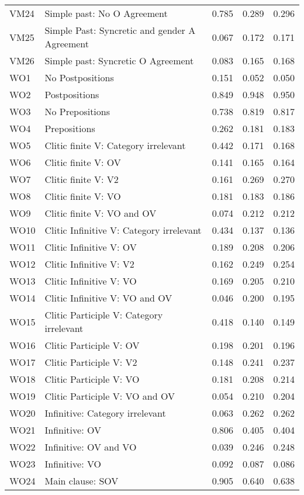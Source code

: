 \begin{longtable}{lllll}
VM24 & Simple past: No O Agreement & 0.785 & 0.289 & 0.296\\
VM25 & Simple Past: Syncretic and gender A Agreement & 0.067 & 0.172 & 0.171\\
VM26 & Simple past: Syncretic O Agreement & 0.083 & 0.165 & 0.168\\
WO1 & No Postpositions & 0.151 & 0.052 & 0.050\\
WO2 & Postpositions & 0.849 & 0.948 & 0.950\\
WO3 & No Prepositions & 0.738 & 0.819 & 0.817\\
WO4 & Prepositions & 0.262 & 0.181 & 0.183\\
WO5 & Clitic finite V: Category irrelevant & 0.442 & 0.171 & 0.168\\
WO6 & Clitic finite V: OV & 0.141 & 0.165 & 0.164\\
WO7 & Clitic finite V: V2 & 0.161 & 0.269 & 0.270\\
WO8 & Clitic finite V: VO & 0.181 & 0.183 & 0.186\\
WO9 & Clitic finite V: VO and OV & 0.074 & 0.212 & 0.212\\
WO10 & Clitic Infinitive V: Category irrelevant & 0.434 & 0.137 & 0.136\\
WO11 & Clitic Infinitive V: OV & 0.189 & 0.208 & 0.206\\
WO12 & Clitic Infinitive V: V2 & 0.162 & 0.249 & 0.254\\
WO13 & Clitic Infinitive V: VO & 0.169 & 0.205 & 0.210\\
WO14 & Clitic Infinitive V: VO and OV & 0.046 & 0.200 & 0.195\\
WO15 & Clitic Participle V: Category irrelevant & 0.418 & 0.140 & 0.149\\
WO16 & Clitic Participle V: OV & 0.198 & 0.201 & 0.196\\
WO17 & Clitic Participle V: V2 & 0.148 & 0.241 & 0.237\\
WO18 & Clitic Participle V: VO & 0.181 & 0.208 & 0.214\\
WO19 & Clitic Participle V: VO and OV & 0.054 & 0.210 & 0.204\\
WO20 & Infinitive: Category irrelevant & 0.063 & 0.262 & 0.262\\
WO21 & Infinitive: OV & 0.806 & 0.405 & 0.404\\
WO22 & Infinitive: OV and VO & 0.039 & 0.246 & 0.248\\
WO23 & Infinitive: VO & 0.092 & 0.087 & 0.086\\
WO24 & Main clause: SOV & 0.905 & 0.640 & 0.638\\

\end{longtable}
